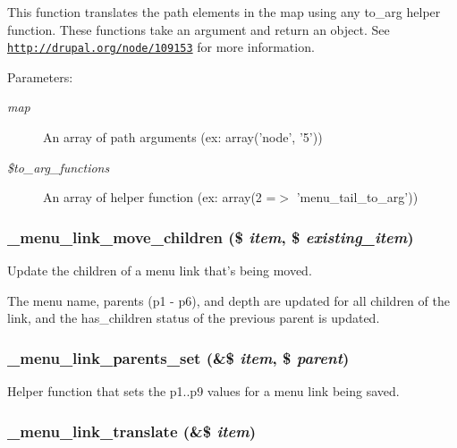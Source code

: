 This function translates the path elements in the map using any to\_\-arg helper function. These functions take an argument and return an object. See \href{http://drupal.org/node/109153}{\tt http://drupal.org/node/109153} for more information.

\begin{Desc}
\item[Parameters:]
\begin{description}
\item[{\em map}]An array of path arguments (ex: array('node', '5')) \item[{\em \$to\_\-arg\_\-functions}]An array of helper function (ex: array(2 =$>$ 'menu\_\-tail\_\-to\_\-arg')) \end{description}
\end{Desc}
\hypertarget{group__menu_geb7542558d6fab7c79b96c1188ee6d67}{
\subsubsection[{\_\-menu\_\-link\_\-move\_\-children}]{\setlength{\rightskip}{0pt plus 5cm}\_\-menu\_\-link\_\-move\_\-children (\$ {\em item}, \/  \$ {\em existing\_\-item})}}
\label{group__menu_geb7542558d6fab7c79b96c1188ee6d67}


Update the children of a menu link that's being moved.

The menu name, parents (p1 - p6), and depth are updated for all children of the link, and the has\_\-children status of the previous parent is updated. \hypertarget{group__menu_g67ab71fff6e17ce3c32752c3bfa00d96}{
\subsubsection[{\_\-menu\_\-link\_\-parents\_\-set}]{\setlength{\rightskip}{0pt plus 5cm}\_\-menu\_\-link\_\-parents\_\-set (\&\$ {\em item}, \/  \$ {\em parent})}}
\label{group__menu_g67ab71fff6e17ce3c32752c3bfa00d96}


Helper function that sets the p1..p9 values for a menu link being saved. \hypertarget{group__menu_g360d727a77cd570860dc7b8382cdba05}{
\subsubsection[{\_\-menu\_\-link\_\-translate}]{\setlength{\rightskip}{0pt plus 5cm}\_\-menu\_\-link\_\-translate (\&\$ {\em item})}}
\label{group__menu_g360d727a77cd570860dc7b8382cdba05}



